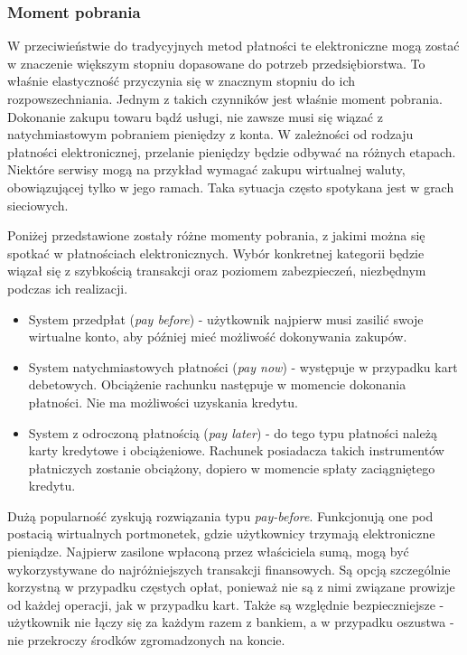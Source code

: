 \subsubsection*{Moment pobrania}
W przeciwieństwie do tradycyjnych metod płatności te elektroniczne mogą zostać w znaczenie większym stopniu dopasowane do potrzeb przedsiębiorstwa. To właśnie  elastyczność przyczynia się w znacznym stopniu do ich rozpowszechniania. Jednym z takich czynników jest właśnie moment pobrania. Dokonanie zakupu towaru bądź usługi, nie zawsze musi się wiązać z natychmiastowym pobraniem pieniędzy z konta. W zależności od rodzaju płatności elektronicznej, przelanie pieniędzy będzie odbywać na różnych etapach. Niektóre serwisy mogą na przykład wymagać zakupu wirtualnej waluty, obowiązującej tylko w jego ramach. Taka sytuacja często spotykana jest w grach sieciowych. 

Poniżej przedstawione zostały różne momenty pobrania, z jakimi można się spotkać w płatnościach elektronicznych. Wybór konkretnej kategorii będzie wiązał się z szybkością transakcji oraz poziomem zabezpieczeń, niezbędnym podczas ich realizacji.
\begin{itemize}
	\item System przedpłat (\textit{pay before}) - użytkownik najpierw musi zasilić swoje wirtualne konto, aby później mieć możliwość dokonywania zakupów.
	\item System natychmiastowych płatności (\textit{pay now}) - występuje w przypadku kart debetowych. Obciążenie rachunku następuje w momencie dokonania płatności. Nie ma możliwości uzyskania kredytu.
	\item System z odroczoną płatnością (\textit{pay later}) - do tego typu płatności należą karty kredytowe i obciążeniowe. Rachunek posiadacza takich instrumentów płatniczych zostanie obciążony, dopiero w momencie spłaty zaciągniętego kredytu.
\end{itemize}
Dużą popularność zyskują rozwiązania typu \textit{pay-before}. Funkcjonują one pod postacią wirtualnych portmonetek, gdzie użytkownicy trzymają elektroniczne pieniądze. Najpierw zasilone wpłaconą przez właściciela sumą, mogą być wykorzystywane do najróżniejszych transakcji finansowych. Są opcją szczególnie korzystną w przypadku częstych opłat, ponieważ nie są z nimi związane prowizje od każdej operacji, jak w przypadku kart. Także są względnie bezpieczniejsze - użytkownik nie łączy się za każdym razem z bankiem, a w przypadku oszustwa - nie przekroczy środków zgromadzonych na koncie.

